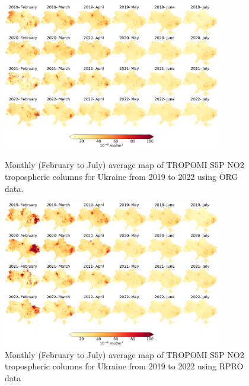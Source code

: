 \begin{figure}[p]
    \centering
    \includegraphics[width=0.85\textwidth]{figs/chap3/fig1_a.png}
    \caption{Monthly (February to July) average map of TROPOMI S5P NO2 tropospheric columns for Ukraine from 2019 to 2022 using ORG data.}
    \label{fig:chap3_fig1a}
    \includegraphics[width=0.85\textwidth]{figs/chap3/fig1_b.png}
    \caption{Monthly (February to July) average map of TROPOMI S5P NO2 tropospheric columns for Ukraine from 2019 to 2022 using RPRO data}
    \label{fig:chap3_fig1b}
\end{figure}

